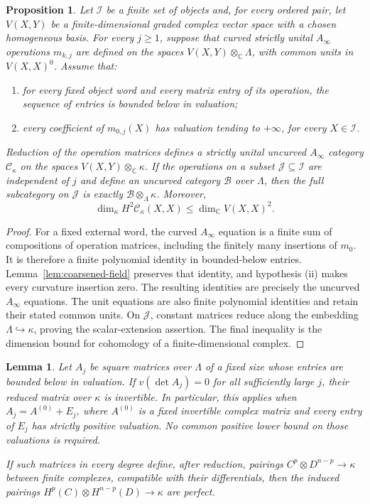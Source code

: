 \documentclass[11pt]{article}
\numberwithin{equation}{section}
\newtheorem{proposition}[theorem]{Proposition}
\newtheorem{lemma}[theorem]{Lemma}
\theoremstyle{definition}
\theoremstyle{remark}
\begin{document}
\begin{proposition}\label{prop:field-category}
Let $\mathcal I$ be a finite set of objects and, for every ordered pair,
let $V(X,Y)$ be a finite-dimensional graded complex vector space with
a chosen homogeneous basis.  For every $j\ge1$, suppose that curved
strictly unital $A_\infty$ operations $m_{k,j}$ are defined on the spaces
$V(X,Y)\otimes_\mathbb C\Lambda$, with common units in $V(X,X)^0$.
Assume that:
\begin{enumerate}[label=\textup{(\roman*)}]
 \item for every fixed object word and every matrix entry of its
 operation, the sequence of entries is bounded below in valuation;
 \item every coefficient of $m_{0,j}(X)$ has valuation tending to
 $+\infty$, for every $X\in\mathcal I$.
\end{enumerate}
Reduction of the operation matrices defines a strictly unital
uncurved $A_\infty$ category $\mathcal C_\kappa$ on the spaces
$V(X,Y)\otimes_\mathbb C\kappa$.
If the operations on a subset $\mathcal J\subseteq\mathcal I$ are
independent of $j$ and define an uncurved category $\mathcal B$ over
$\Lambda$, then the full subcategory on $\mathcal J$ is exactly
$\mathcal B\otimes_\Lambda\kappa$.  Moreover,
\[
 \dim_\kappa H^2\mathcal C_\kappa(X,X)
       \le \dim_\mathbb C V(X,X)^2.
\]
\end{proposition}

\begin{proof}
For a fixed external word, the curved $A_\infty$ equation is a finite
sum of compositions of operation matrices, including the finitely
many insertions of $m_0$.  It is therefore a finite polynomial
identity in bounded-below entries.  Lemma~\ref{lem:coarsened-field}
preserves that identity, and hypothesis \textup{(ii)} makes every
curvature insertion zero.  The resulting identities are precisely
the uncurved $A_\infty$ equations.  The unit equations are also finite
polynomial identities and retain their stated common units.  On
$\mathcal J$, constant matrices reduce along the embedding
$\Lambda\hookrightarrow\kappa$, proving the scalar-extension
assertion.  The final inequality is the dimension bound for
cohomology of a finite-dimensional complex.
\end{proof}

\begin{lemma}\label{lem:field-pairing}
Let $A_j$ be square matrices over $\Lambda$ of a fixed size whose
entries are bounded below in valuation.  If $v(\det A_j)=0$ for all
sufficiently large $j$, their reduced matrix over $\kappa$ is
invertible.  In particular, this applies when
$A_j=A^{(0)}+E_j$, where $A^{(0)}$ is a fixed invertible complex
matrix and every entry of $E_j$ has strictly positive valuation.
No common positive lower bound on those valuations is required.

If such matrices in every degree define, after reduction, pairings
$C^p\otimes D^{n-p}\to\kappa$ between finite complexes, compatible
with their differentials, then the induced pairings
$H^p(C)\otimes H^{n-p}(D)\to\kappa$ are perfect.
\end{lemma}
\end{document}
